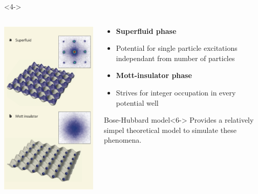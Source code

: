 \documentclass[aspectratio=169]{beamer}
\begin{document}
\begin{frame}
\begin{onlyenv}
\begin{columns}[T]
    \end{columns}
  \end{onlyenv}
  \begin{onlyenv}<4->
    \begin{columns}[T] %
      \begin{column}{.48\textwidth}
        \begin{center}
          \includegraphics[scale=0.2]{../img/SF-MI.png}
        \end{center}
      \end{column}%
      \hfill%
      \begin{column}{.48\textwidth}
        \begin{itemize}
          \item<4-> \textbf{Superfluid phase}
          \item<4-> Potential for single particle excitations independant from number of particles
          \item<4-> \textbf{Mott-insulator phase}
          \item<5-> Strives for integer occupation in every potential well
        \end{itemize}
        \begin{alertblock}{Bose-Hubbard model}<6->
          Provides a relatively simpel theoretical model to simulate these phenomena.
        \end{alertblock}
      \end{column}%
    \end{columns}
  \end{onlyenv}
\end{frame}
\end{document}
